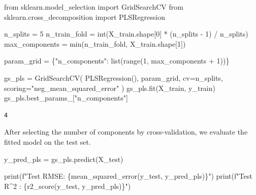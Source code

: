 \documentclass[
  letterpaper,
  DIV=11,
  numbers=noendperiod]{scrreprt}
\newenvironment{Shaded}{\begin{snugshade}}{\end{snugshade}}
\newcommand{\BuiltInTok}[1]{\textcolor[rgb]{0.00,0.23,0.31}{#1}}
\newcommand{\DecValTok}[1]{\textcolor[rgb]{0.68,0.00,0.00}{#1}}
\newcommand{\ImportTok}[1]{\textcolor[rgb]{0.00,0.46,0.62}{#1}}
\newcommand{\NormalTok}[1]{\textcolor[rgb]{0.00,0.23,0.31}{#1}}
\newcommand{\OperatorTok}[1]{\textcolor[rgb]{0.37,0.37,0.37}{#1}}
\newcommand{\SpecialCharTok}[1]{\textcolor[rgb]{0.37,0.37,0.37}{#1}}
\newcommand{\SpecialStringTok}[1]{\textcolor[rgb]{0.13,0.47,0.30}{#1}}
\newcommand{\StringTok}[1]{\textcolor[rgb]{0.13,0.47,0.30}{#1}}
\theoremstyle{definition}
\theoremstyle{definition}
\theoremstyle{plain}
\theoremstyle{plain}
\theoremstyle{remark}
\begin{document}
\begin{Shaded}
\begin{Highlighting}[]
\ImportTok{from}\NormalTok{ sklearn.model\_selection }\ImportTok{import}\NormalTok{ GridSearchCV}
\ImportTok{from}\NormalTok{ sklearn.cross\_decomposition }\ImportTok{import}\NormalTok{ PLSRegression}

\NormalTok{n\_splits }\OperatorTok{=} \DecValTok{5}
\NormalTok{n\_train\_fold }\OperatorTok{=} \BuiltInTok{int}\NormalTok{(X\_train.shape[}\DecValTok{0}\NormalTok{] }\OperatorTok{*}\NormalTok{ (n\_splits }\OperatorTok{{-}} \DecValTok{1}\NormalTok{) }\OperatorTok{/}\NormalTok{ n\_splits)}
\NormalTok{max\_components }\OperatorTok{=} \BuiltInTok{min}\NormalTok{(n\_train\_fold, X\_train.shape[}\DecValTok{1}\NormalTok{])}

\NormalTok{param\_grid }\OperatorTok{=}\NormalTok{ \{}\StringTok{"n\_components"}\NormalTok{: }\BuiltInTok{list}\NormalTok{(}\BuiltInTok{range}\NormalTok{(}\DecValTok{1}\NormalTok{, max\_components }\OperatorTok{+} \DecValTok{1}\NormalTok{))\}}

\NormalTok{gs\_pls }\OperatorTok{=}\NormalTok{ GridSearchCV(}
\NormalTok{    PLSRegression(), param\_grid, cv}\OperatorTok{=}\NormalTok{n\_splits, scoring}\OperatorTok{=}\StringTok{"neg\_mean\_squared\_error"}
\NormalTok{)}
\NormalTok{gs\_pls.fit(X\_train, y\_train)}
\NormalTok{gs\_pls.best\_params\_[}\StringTok{"n\_components"}\NormalTok{]}
\end{Highlighting}
\end{Shaded}

\begin{verbatim}
4
\end{verbatim}

After selecting the number of components by cross-validation, we
evaluate the fitted model on the test set.

\begin{Shaded}
\begin{Highlighting}[]
\NormalTok{y\_pred\_pls }\OperatorTok{=}\NormalTok{ gs\_pls.predict(X\_test)}

\BuiltInTok{print}\NormalTok{(}\SpecialStringTok{f"Test RMSE: }\SpecialCharTok{\{}\NormalTok{mean\_squared\_error(y\_test, y\_pred\_pls)}\SpecialCharTok{\}}\SpecialStringTok{"}\NormalTok{)}
\BuiltInTok{print}\NormalTok{(}\SpecialStringTok{f"Test R\^{}2 : }\SpecialCharTok{\{}\NormalTok{r2\_score(y\_test, y\_pred\_pls)}\SpecialCharTok{\}}\SpecialStringTok{"}\NormalTok{)}
\end{Highlighting}
\end{Shaded}
\end{document}

